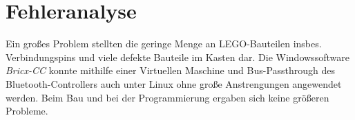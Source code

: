 \section{Fehleranalyse}

Ein großes Problem stellten die geringe Menge an LEGO-Bauteilen insbes. Verbindungspins und viele defekte Bauteile im Kasten dar. Die Windowssoftware \textit{Bricx-CC} konnte mithilfe einer Virtuellen Maschine und Bus-Passthrough des Bluetooth-Controllers auch unter Linux ohne große Anstrengungen angewendet werden. Beim Bau und bei der Programmierung ergaben sich keine größeren Probleme.